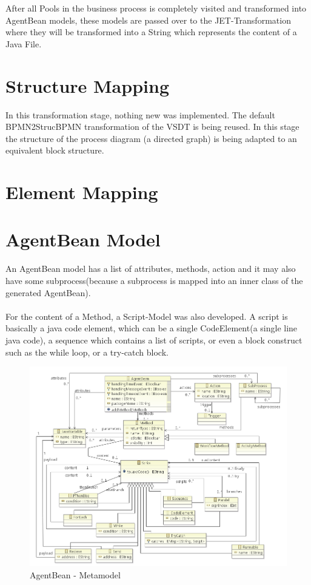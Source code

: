 After all Pools in the business process is completely visited and transformed into AgentBean models, these models are passed over to the JET-Transformation where they will be transformed into a String which represents the content of a Java File. 

\section{Structure Mapping}
In this transformation stage, nothing new was implemented. The default BPMN2StrucBPMN transformation of the VSDT is being reused. In this stage the structure of the process diagram (a directed graph) is being adapted to an equivalent block structure.  

\section{Element Mapping}

\section{AgentBean Model}

An AgentBean model has a list of attributes, methods, action and it may also have some subprocess(because a subprocess is mapped into an inner class of the generated AgentBean).\\\\
For the content of a Method, a Script-Model was also developed. A script is basically a java code element, which can be a single CodeElement(a single line java code), a sequence which contains a list of scripts, or even a block construct such as the while loop, or a try-catch block. 

\begin{figure}[h]
	\centering\includegraphics[width=1.0\textwidth]{images/agentBean_metamodel.png}
	\caption{AgentBean - Metamodel}
	\label{fig:agentbean_metamodel}
\end{figure}


